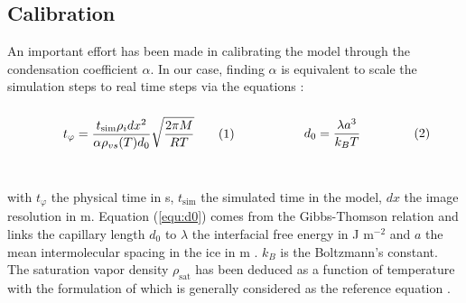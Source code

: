 \documentclass[draft,ms]{agujournal2019}
\begin{document}
\subsection{Calibration} 
\label{subsec:calib}

An important effort has been made in calibrating the model through the condensation coefficient $\alpha$. In our case, finding $\alpha$ is equivalent to scale the simulation steps to real time steps via the equations \cite{bretin_and_denis_discrete-continuous_2015}: \\

\begin{subequations}\label{equ:alpha}
\begin{minipage}{0.45\textwidth}\begin{align}
    t_\varphi = \frac{t_{\text{sim}} \rho_i dx^2}{\alpha \rho_{v s}(T) d_0} \sqrt{\frac{2 \pi M}{R T}}
\end{align}\end{minipage}
\begin{minipage}{0.45\textwidth}\begin{align}\label{equ:d0}
    d_0 = \frac{\lambda a^3}{k_B T}
\end{align}\end{minipage}
\end{subequations}\\
\vspace{0.3cm}

\noindent with $t_{\varphi}$ the physical time in s, $t_{\text{sim}}$ the simulated time in the model, $dx$ the image resolution in m. Equation (\ref{equ:d0}) comes from the  Gibbs-Thomson relation and links the capillary length $d_0$ to $\lambda$ the interfacial free energy in J m$^{-2}$ and $a$ the mean intermolecular spacing in the ice in m \cite{kaempfer_phase-field_2009}. $k_B$ is the Boltzmann's constant. The saturation vapor density $\rho_{\text{sat}}$ has been deduced as a function of temperature with the formulation of  which is generally considered as the reference equation \cite{murphy2005review}. 
\end{document}
